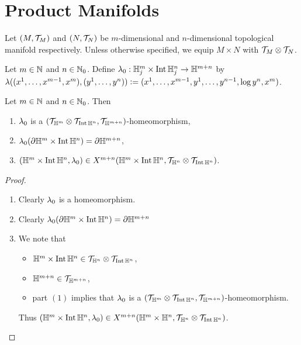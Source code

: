 \documentclass{book}
\begin{document}
\newpage
\section{Product Manifolds}

\begin{note} 
	Let $(M, \mathcal{T}_M)$ and $(N, \mathcal{T}_N)$ be $m$-dimensional and $n$-dimensional topological manifold respectively. Unless otherwise specified, we equip $M \times N$ with $\mathcal{T}_M \otimes \mathcal{T}_N$. 
\end{note}

\begin{defn} 
	Let $m \in \mathbb{N}$ and $n \in \mathbb{N}_0$. Define $\lambda_0: \mathbb{H}^m_j \times \operatorname{Int} \mathbb{H}^n_j \rightarrow \mathbb{H}^{m+n}$ by $\lambda((x^1, \ldots, x^{m-1}, x^m), (y^1, \ldots, y^n)) \vcentcolon= (x^1, \ldots, x^{m-1}, y^1, \ldots, y^{n-1}, \log y^n, x^m)$.  
\end{defn}

\begin{ex} 
	Let $m \in \mathbb{N}$ and $n \in \mathbb{N}_0$. Then 
	\begin{enumerate}
		\item $\lambda_0$ is a $(\mathcal{T}_{\mathbb{H}^m} \otimes \mathcal{T}_{\operatorname{Int} \mathbb{H}^n}, \mathcal{T}_{\mathbb{H}^{m+n}})$-homeomorphism,
		\item $\lambda_0(\partial \mathbb{H}^m \times \operatorname{Int} \mathbb{H}^n) = \partial \mathbb{H}^{m+n}$,
		\item $(\mathbb{H}^m \times \operatorname{Int} \mathbb{H}^n, \lambda_0) \in X^{m+n}(\mathbb{H}^m \times \operatorname{Int} \mathbb{H}^n, \mathcal{T}_{\mathbb{H}^n} \otimes \mathcal{T}_{\operatorname{Int} \mathbb{H}^n})$.
	\end{enumerate}
\end{ex}

\begin{proof}\
	\begin{enumerate}
		\item Clearly $\lambda_0$ is a homeomorphism.
		\item Clearly $\lambda_0(\partial \mathbb{H}^m \times \operatorname{Int} \mathbb{H}^n) = \partial \mathbb{H}^{m+n}$
		\item We note that
		\begin{itemize}
			\item $\mathbb{H}^m \times \operatorname{Int} \mathbb{H}^n \in \mathcal{T}_{\mathbb{H}^n} \otimes \mathcal{T}_{\operatorname{Int} \mathbb{H}^n}$,
			\item $\mathbb{H}^{m+n} \in \mathcal{T}_{\mathbb{H}^{m+n}}$,
			\item part $(1)$ implies that $\lambda_0$ is a $(\mathcal{T}_{\mathbb{H}^m} \otimes \mathcal{T}_{\operatorname{Int} \mathbb{H}^n}, \mathcal{T}_{\mathbb{H}^{m+n}})$-homeomorphism.
		\end{itemize}
		Thus $(\mathbb{H}^m \times \operatorname{Int} \mathbb{H}^n, \lambda_0) \in X^{m+n}(\mathbb{H}^m \times \mathbb{H}^n, \mathcal{T}_{\mathbb{H}^n} \otimes \mathcal{T}_{\operatorname{Int} \mathbb{H}^n})$.
	\end{enumerate}
\end{proof}
\end{document}
